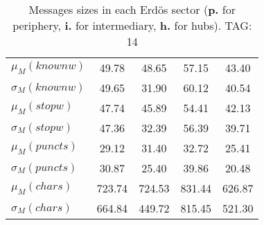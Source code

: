 \begin{table}[h!]
\begin{center}
\begin{tabular}{| l || c | c | c | c |}
$\mu_M(knownw)$ & 49.78  & 48.65  & 57.15  & 43.40 \\
$\sigma_M(knownw)$ & 49.65  & 31.90  & 60.12  & 40.54 \\\hline
$\mu_M(stopw)$ & 47.74  & 45.89  & 54.41  & 42.13 \\
$\sigma_M(stopw)$ & 47.36  & 32.39  & 56.39  & 39.71 \\\hline
$\mu_M(puncts)$ & 29.12  & 31.40  & 32.72  & 25.41 \\
$\sigma_M(puncts)$ & 30.87  & 25.40  & 39.86  & 20.48 \\\hline
$\mu_M(chars)$ & 723.74  & 724.53  & 831.44  & 626.87 \\
$\sigma_M(chars)$ & 664.84  & 449.72  & 815.45  & 521.30 \\\hline
\end{tabular}
\caption{Messages sizes in each Erd\"os sector ({{\bf p.}} for periphery, {{\bf i.}} for intermediary, {{\bf h.}} for hubs). TAG: 14}
\end{center}
\end{table}